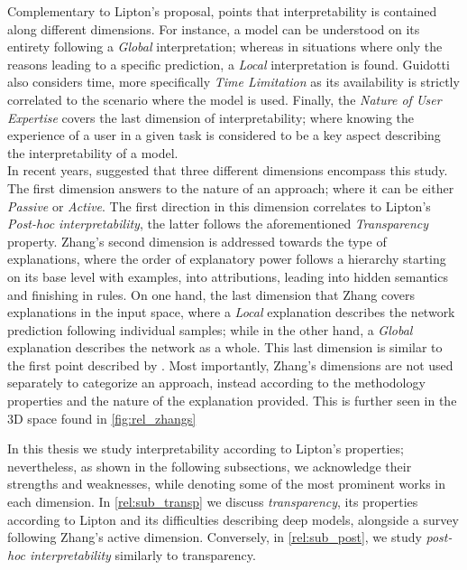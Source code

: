\noindent Complementary to Lipton's proposal, \cite{guidotti2018survey} points that interpretability is 
contained along different dimensions. For instance, a model can be understood on its entirety 
following a \emph{Global} interpretation; whereas in situations where only the reasons leading to a 
specific prediction, a \emph{Local} interpretation is found. Guidotti also considers time,
more specifically \emph{Time Limitation} as its availability is strictly correlated to the scenario 
where the model is used. Finally, the \emph{Nature of User Expertise} covers the last dimension of 
interpretability; where knowing the experience of a user in a given task is considered to be a 
key aspect describing the interpretability of a model.\\

\noindent In recent years, \cite{zhang2021survey} suggested that three different dimensions encompass this 
study. The first dimension answers to the nature of an approach; where it can be either 
\emph{Passive} or \emph{Active}. The first direction in this dimension correlates to Lipton's 
\emph{Post-hoc interpretability}, the latter follows the aforementioned \emph{Transparency} property.
Zhang's second dimension is addressed towards the type of explanations, where the order of 
explanatory power follows a hierarchy starting on its base level with examples, into attributions, 
leading into hidden semantics and finishing in rules. On one hand, the last dimension that Zhang 
covers explanations in the input space, where a \emph{Local} explanation describes the network  
prediction following individual samples; while in the other hand, a \emph{Global} explanation 
describes the network as a whole. This last dimension is similar to the first point described by 
\cite{guidotti2018survey}. Most importantly, Zhang's dimensions are not used separately to 
categorize an approach, instead according to the methodology properties and the nature of the 
explanation provided. This is further seen in the 3D space found in \autoref{fig:rel_zhangs}


 
\noindent In this thesis we study interpretability according to Lipton's properties; nevertheless, as shown 
in the following subsections, we acknowledge their strengths and weaknesses, while denoting some of 
the most prominent works in each dimension. In \autoref{rel:sub_transp} we discuss 
\emph{transparency}, its properties according to Lipton and its difficulties describing deep models, 
alongside a survey following Zhang's active dimension. Conversely, in \autoref{rel:sub_post}, we 
study \emph{post-hoc interpretability} similarly to transparency.

